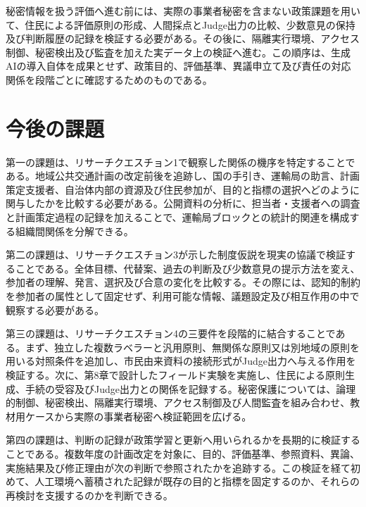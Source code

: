 秘密情報を扱う評価へ進む前には、実際の事業者秘密を含まない政策課題を用いて、住民による評価原則の形成、人間採点とJudge出力の比較、少数意見の保持及び判断履歴の記録を検証する必要がある。その後に、隔離実行環境、アクセス制御、秘密検出及び監査を加えた実データ上の検証へ進む。この順序は、生成AIの導入自体を成果とせず、政策目的、評価基準、異議申立て及び責任の対応関係を段階ごとに確認するためのものである。

\section{今後の課題}
\label{sec:ch10_future_work}

第一の課題は、リサーチクエスチョン1で観察した関係の機序を特定することである。地域公共交通計画の改定前後を追跡し、国の手引き、運輸局の助言、計画策定支援者、自治体内部の資源及び住民参加が、目的と指標の選択へどのように関与したかを比較する必要がある。公開資料の分析に、担当者・支援者への調査と計画策定過程の記録を加えることで、運輸局ブロックとの統計的関連を構成する組織間関係を分解できる。

第二の課題は、リサーチクエスチョン3が示した制度仮説を現実の協議で検証することである。全体目標、代替案、過去の判断及び少数意見の提示方法を変え、参加者の理解、発言、選択及び合意の変化を比較する。その際には、認知的制約を参加者の属性として固定せず、利用可能な情報、議題設定及び相互作用の中で観察する必要がある。

第三の課題は、リサーチクエスチョン4の三要件を段階的に結合することである。まず、独立した複数ラベラーと汎用原則、無関係な原則又は別地域の原則を用いる対照条件を追加し、市民由来資料の接続形式がJudge出力へ与える作用を検証する。次に、第8章で設計したフィールド実験を実施し、住民による原則生成、手続の受容及びJudge出力との関係を記録する。秘密保護については、論理的制御、秘密検出、隔離実行環境、アクセス制御及び人間監査を組み合わせ、教材用ケースから実際の事業者秘密へ検証範囲を広げる。

第四の課題は、判断の記録が政策学習と更新へ用いられるかを長期的に検証することである。複数年度の計画改定を対象に、目的、評価基準、参照資料、異論、実施結果及び修正理由が次の判断で参照されたかを追跡する。この検証を経て初めて、人工環境へ蓄積された記録が既存の目的と指標を固定するのか、それらの再検討を支援するのかを判断できる。

